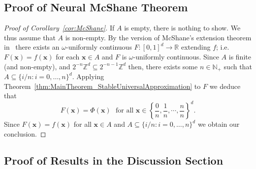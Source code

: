 \documentclass{article}
\numberwithin{equation}{section}
\theoremstyle{definition}
\begin{document}
\subsection{Proof of Neural McShane Theorem}
\begin{proof}[{Proof of Corollary~\ref{cor:McShane}}]
If $A$ is empty, there is nothing to show.  We thus assume that $A$ is non-empty.
By the version of McShane's extension theorem in~\cite[Theorem 3]{beer2020mcshane} there exists an $\omega$-uniformly continuous $F:[0,1]^d\to \mathbb{R}$ extending $f$; i.e.\ $F(\mathbf{x})=f(\mathbf{x})$ for each $\mathbf{x}\in A$ and $F$ is $\omega$-uniformly continuous.  
Since $A$ is finite (and non-empty), and $2^{-n}\mathbb{Z}^d\subseteq 2^{-n-1}\mathbb{Z}^d$ then, there exists some $n\in \mathbb{N}_+$ such that $A\subseteq 
\{i/n:i=0,\dots,n\}^d$.  Applying Theorem~\ref{thm:MainTheorem_StableUniversalApproximation} to $F$ we deduce that
\[
    F(\mathbf{x})=\Phi(\mathbf{x}) 
        \,\,
        \mbox{ for all } \mathbf{x}\in
        \left\{ \frac{0}{n}, \frac{1}{n}, \cdots, \frac{n}{n} \right\}^d
.
\]
Since $F(\mathbf{x})=f(\mathbf{x})$ for all $\mathbf{x}\in A$ and $A\subseteq \{i/n:i=0,\dots,n\}^d$ we obtain our conclusion.
\end{proof}

\subsection{Proof of Results in the Discussion Section}
\label{s:Proofs__ss:Discussion}
\end{document}
